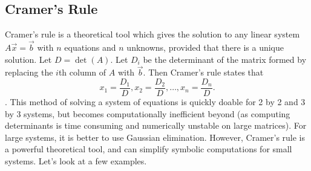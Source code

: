 \subsection{Cramer's Rule}
Cramer's rule is a theoretical tool which gives the solution to any linear system $A\vec x = \vec b$ with $n$ equations and $n$ unknowns, provided that there is a unique solution.  
Let $D=\det(A)$. 
Let $D_i$ be the determinant of the matrix formed by replacing the $i$th column of $A$ with $\vec b$.  
Then Cramer's rule states that $$x_1 = \frac{D_1}{D},x_2 = \frac{D_2}{D},\ldots, x_n = \frac{D_n}{D}.$$ 
. 
This method of solving a system of equations is quickly doable for 2 by 2 and 3 by 3 systems, but becomes computationally inefficient beyond (as computing determinants is time consuming and numerically unstable on large matrices). 
For large systems, it is better to use Gaussian elimination. 
However, Cramer's rule is a powerful theoretical tool, and can simplify symbolic computations for small systems. Let's look at a few examples.


